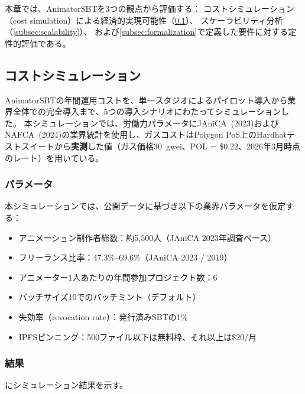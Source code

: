 
本章では、AnimatorSBTを3つの観点から評価する：
コストシミュレーション（cost simulation）による経済的実現可能性（\cref{subsec:cost_sim}）、
スケーラビリティ分析（\cref{subsec:scalability}）、
および\cref{subsec:formalization}で定義した要件に対する定性的評価である。

\subsection{コストシミュレーション}
\label{subsec:cost_sim}

AnimatorSBTの年間運用コストを、単一スタジオによるパイロット導入から業界全体での完全導入まで、5つの導入シナリオにわたってシミュレーションした。
本シミュレーションでは、労働力パラメータにJAniCA~(2023)およびNAFCA~(2024)の業界統計を使用し、ガスコストはPolygon PoS上のHardhatテストスイートから\textbf{実測}した値（ガス価格30~gwei、POL = \$0.22、2026年3月時点のレート）を用いている。

\subsubsection{パラメータ}

本シミュレーションでは、公開データに基づき以下の業界パラメータを仮定する：

\begin{itemize}
  \item アニメーション制作者総数：約5{,}500人（JAniCA 2023年調査ベース）
  \item フリーランス比率：47.3\%--69.6\%（JAniCA 2023 / 2019）
  \item アニメーター1人あたりの年間参加プロジェクト数：6
  \item バッチサイズ10でのバッチミント（デフォルト）
  \item 失効率（revocation rate）：発行済みSBTの1\%
  \item IPFSピンニング：500ファイル以下は無料枠、それ以上は\$20/月~\cite{pinata2026pricing}
\end{itemize}

\subsubsection{結果}

にシミュレーション結果を示す。

